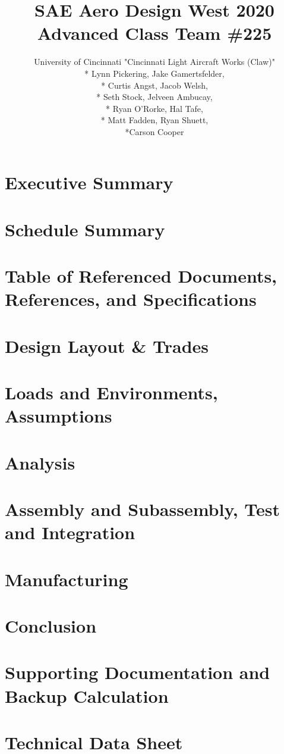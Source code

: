 \documentclass{article}
\title{SAE Aero Design West 2020 Advanced Class Team \#225}
\author{University of Cincinnati "Cincinnati Light Aircraft Works (Claw)"\\* Lynn Pickering, Jake Gamertsfelder,\\* Curtis Angst, Jacob Welsh,\\* Seth Stock, Jelveen Ambucay,\\* Ryan O'Rorke, Hal Tafe,\\* Matt Fadden, Ryan Shuett, \\*Carson Cooper}
\begin{document}
\maketitle
\newpage
\listoffigures
\tableofcontents
\newpage
\section{Executive Summary}
\section{Schedule Summary}
\section{Table of Referenced Documents, References, and Specifications}
\section{Design Layout \& Trades}
\section{Loads and Environments, Assumptions}
\section{Analysis}
\section{Assembly and Subassembly, Test and Integration}
\section{Manufacturing}
\section{Conclusion}
\begin{appendices}
\section{Supporting Documentation and Backup Calculation}
\section{Technical Data Sheet}
\end{appendices}
\end{document}
